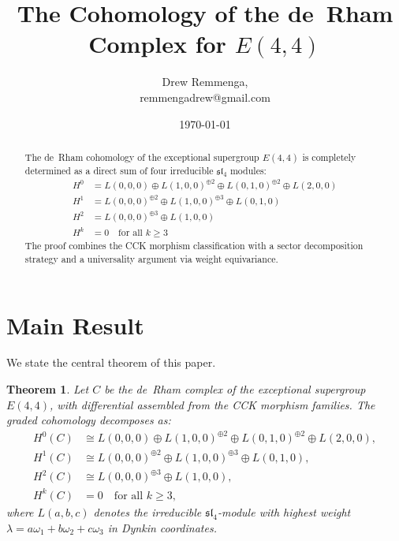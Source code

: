 \documentclass[reqno,10pt]{amsart}
\theoremstyle{plain}
\newtheorem{theorem}{Theorem}[section]
\theoremstyle{definition}
\newcommand{\slfrak}{\mathfrak{sl}}
\begin{document}
\title{The Cohomology of the de~Rham Complex for $E(4,4)$}
\author{Drew Remmenga, \\ remmengadrew@gmail.com}
\date{\today}
\maketitle

\begin{abstract}
  The de~Rham cohomology of the exceptional supergroup $E(4,4)$ is completely 
  determined as a direct sum of four irreducible $\slfrak_4$ modules:
  \begin{align*}
    H^0 &= L(0,0,0) \oplus L(1,0,0)^{\oplus 2} \oplus L(0,1,0)^{\oplus 2} \oplus L(2,0,0) \\
    H^1 &= L(0,0,0)^{\oplus 2} \oplus L(1,0,0)^{\oplus 3} \oplus L(0,1,0) \\
    H^2 &= L(0,0,0)^{\oplus 3} \oplus L(1,0,0) \\
    H^k &= 0 \quad \text{for all } k \geq 3
  \end{align*}
  The proof combines the CCK morphism classification with a sector decomposition 
  strategy and a universality argument via weight equivariance.
\end{abstract}

\section{Main Result}

We state the central theorem of this paper.

\begin{theorem}
\label{thm:main}
  Let $C$ be the de~Rham complex of the exceptional supergroup $E(4,4)$, 
  with differential assembled from the CCK morphism families. The graded 
  cohomology decomposes as:
  \begin{align}
    H^0(C) &\cong L(0,0,0) \oplus L(1,0,0)^{\oplus 2} \oplus L(0,1,0)^{\oplus 2} 
              \oplus L(2,0,0), \\
    H^1(C) &\cong L(0,0,0)^{\oplus 2} \oplus L(1,0,0)^{\oplus 3} \oplus L(0,1,0), \\
    H^2(C) &\cong L(0,0,0)^{\oplus 3} \oplus L(1,0,0), \\
    H^k(C) &= 0 \quad \text{for all } k \geq 3,
  \end{align}
  where $L(a,b,c)$ denotes the irreducible $\slfrak_4$-module with highest weight 
  $\lambda = a\omega_1 + b\omega_2 + c\omega_3$ in Dynkin coordinates.
\end{theorem}
\end{document}
